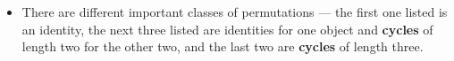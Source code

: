 \documentclass[../main.tex]{subfiles}
\begin{document}
\begin{itemize}
\begin{itemize}
\begin{itemize}
\begin{align*}
                    \begin{pmatrix}
                        1 & 2 & 3\\
                        2 & 1 & 3\\
                    \end{pmatrix},
                    \begin{pmatrix}
                        1 & 2 & 3\\
                        3 & 2 & 1\\
                    \end{pmatrix},
                    \begin{pmatrix}
                        1 & 2 & 3\\
                        1 & 3 & 2\\
                    \end{pmatrix},
                    \begin{pmatrix}
                        1 & 2 & 3\\
                        2 & 3 & 1\\
                    \end{pmatrix},
                    \begin{pmatrix}
                        1 & 2 & 3\\
                        3 & 1 & 2\\
                    \end{pmatrix}
                \right\}\\
                &= \left\{
                    \permtwo{1}{2}{3},
                    \permtwo{2}{1}{3},
                    \permtwo{3}{2}{1},
                    \permtwo{1}{3}{2},
                    \permtwo{2}{3}{1},
                    \permtwo{3}{1}{2}
                \right\}
            \end{align*}
            \item There are different important classes of permutations --- the first one listed is an identity, the next three listed are identities for one object and \textbf{cycles} of length two for the other two, and the last two are \textbf{cycles} of length three.

\end{itemize}
\end{itemize}
\end{itemize}
\end{document}

